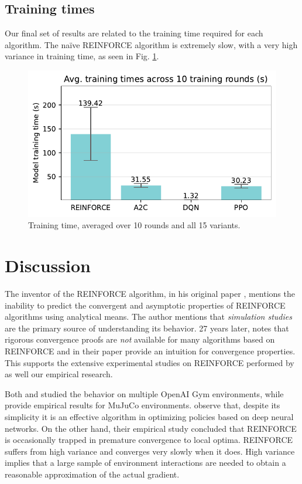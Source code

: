 \documentclass[a4paper, 12pt]{article}
\begin{document}
\subsection{Training times}
Our final set of results are related to the training time required for each algorithm. The na\"ive REINFORCE algorithm is extremely slow, with a very high variance in training time, as seen in Fig. \ref{fig:tr-time}.
\begin{figure}[ht]
	\centering
	\includegraphics[width=0.6\linewidth]{Model_training_time.pdf}  
	\caption{Training time, averaged over 10 rounds and all 15 variants.}
	\label{fig:tr-time}
\end{figure}

\section{Discussion}\label{sec:Discussion}
The inventor of the REINFORCE algorithm, in his original paper \cite{REINFORCE-williams1992}, mentions the inability to predict the convergent and asymptotic properties of REINFORCE algorithms using analytical means. The author mentions that \textit{simulation studies} are the primary source of understanding its behavior. 27 years later, \cite{peck2019} notes that rigorous convergence proofs are \textit{not} available for many algorithms based on REINFORCE and in their paper provide an intuition for convergence properties. This supports the extensive experimental studies on REINFORCE performed by \cite{zhang2021sample, zhang2021convergence, peck2019, duan2016benchmarking} as well our empirical research.

Both \cite{duan2016benchmarking} and \cite{zhang2021convergence} studied the behavior on multiple OpenAI Gym environments, while \cite{peck2019} provide empirical results for MuJuCo environments. \cite{duan2016benchmarking} observe that, despite its simplicity it is an effective algorithm in optimizing policies based on deep neural networks. On the other hand, their empirical study concluded that REINFORCE is occasionally trapped in premature convergence to local optima. REINFORCE suffers from high variance \citep{peck2019} and converges very slowly when it does. High variance implies that a large sample of environment interactions are needed to obtain a reasonable approximation of the actual gradient. 
\end{document}
